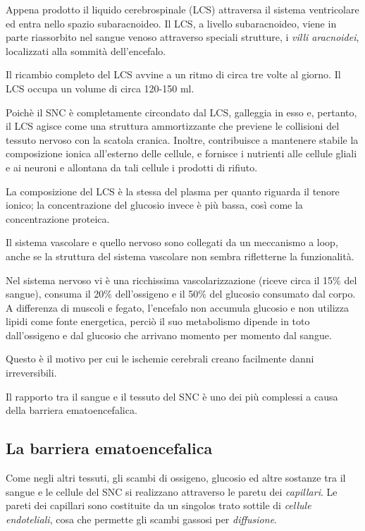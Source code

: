 \documentclass[]{article}
\begin{document}
Appena prodotto il liquido cerebrospinale (LCS) attraversa il sistema
ventricolare ed entra nello spazio subaracnoideo. Il LCS, a livello
subaracnoideo, viene in parte riassorbito nel sangue venoso attraverso
speciali strutture, i \emph{villi aracnoidei}, localizzati alla sommità
dell'encefalo.

Il ricambio completo del LCS avvine a un ritmo di circa tre volte al
giorno. Il LCS occupa un volume di circa 120-150 ml.

Poichè il SNC è completamente circondato dal LCS, galleggia in esso e,
pertanto, il LCS agisce come una struttura ammortizzante che previene le
collisioni del tessuto nervoso con la scatola cranica. Inoltre,
contribuisce a mantenere stabile la composizione ionica all'esterno
delle cellule, e fornisce i nutrienti alle cellule gliali e ai neuroni e
allontana da tali cellule i prodotti di rifiuto.

La composizione del LCS è la stessa del plasma per quanto riguarda il
tenore ionico; la concentrazione del glucosio invece è più bassa, così
come la concentrazione proteica.

Il sistema vascolare e quello nervoso sono collegati da un meccanismo a
loop, anche se la struttura del sistema vascolare non sembra rifletterne
la funzionalità.

Nel sistema nervoso vi è una ricchissima vascolarizzazione (riceve circa
il 15\% del sangue), consuma il 20\% dell'ossigeno e il 50\% del
glucosio consumato dal corpo. A differenza di muscoli e fegato,
l'encefalo non accumula glucosio e non utilizza lipidi come fonte
energetica, perciò il suo metabolismo dipende in toto dall'ossigeno e
dal glucosio che arrivano momento per momento dal sangue.

Questo è il motivo per cui le ischemie cerebrali creano facilmente danni
irreversibili.

Il rapporto tra il sangue e il tessuto del SNC è uno dei più complessi a
causa della barriera ematoencefalica.

\subsection{La barriera
ematoencefalica}\label{la-barriera-ematoencefalica}

Come negli altri tessuti, gli scambi di ossigeno, glucosio ed altre
sostanze tra il sangue e le cellule del SNC si realizzano attraverso le
paretu dei \emph{capillari}. Le pareti dei capillari sono costituite da
un singolos trato sottile di \emph{cellule endoteliali}, cosa che
permette gli scambi gassosi per \emph{diffusione}.
\end{document}
